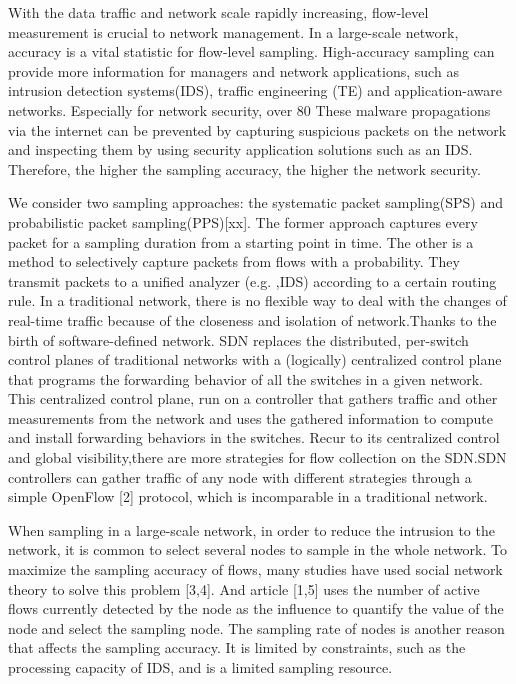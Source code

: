 \documentclass[conference]{IEEEtran}
\begin{document}
With the data traffic and network scale rapidly increasing, flow-level measurement is crucial to network management. In a large-scale network, accuracy is a vital statistic for flow-level sampling. High-accuracy sampling can provide more information for managers and network applications, such as intrusion detection systems(IDS), traffic engineering (TE) and application-aware networks. Especially for network security, over 80%
These malware propagations via the internet can be prevented by capturing suspicious packets on the network and inspecting them by using security application solutions such as an IDS. Therefore, the higher the sampling accuracy, the higher the network security.
        

We consider two sampling approaches: the systematic packet sampling(SPS) and probabilistic packet sampling(PPS)[xx]. The former approach captures every packet for a sampling duration from a starting point in time. The other is a method to selectively capture packets from flows with a probability. They transmit packets to a unified analyzer (e.g. ,IDS) according to a certain routing rule. 
In a traditional network, there is no flexible way to deal with the changes of real-time traffic because of the closeness and isolation of network.Thanks to the birth of software-defined network. SDN replaces the distributed, per-switch control planes of traditional networks with a (logically) centralized control plane that programs the forwarding behavior of all the switches in a given network. This centralized control plane, run on a controller that gathers traffic and other measurements from the network and uses the gathered information to compute and install forwarding behaviors in the switches. Recur to its centralized control and global visibility,there are more strategies for flow collection on the SDN.SDN controllers can gather traffic of any node with different strategies through a simple OpenFlow [2] protocol, which is incomparable in a traditional network.

When sampling in a large-scale network, in order to reduce the intrusion to the network, it is common to select several nodes to sample in the whole network. 
To maximize the sampling accuracy of flows, many studies have used  social network theory to solve this problem [3,4]. And article [1,5] uses the number of active flows currently  detected by the node  as the influence to quantify the value of the node and select the sampling node.
The sampling rate of nodes is another reason that affects the sampling accuracy. It is limited by constraints, such as the processing capacity of IDS, and is a limited sampling resource.
\end{document}
